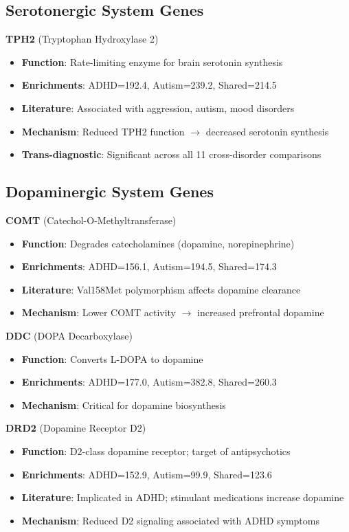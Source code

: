 \documentclass[12pt,letterpaper]{article}
\begin{document}
\subsection{Serotonergic System Genes}

\textbf{TPH2} (Tryptophan Hydroxylase 2)
\begin{itemize}
    \item \textbf{Function}: Rate-limiting enzyme for brain serotonin synthesis
    \item \textbf{Enrichments}: ADHD=192.4, Autism=239.2, Shared=214.5
    \item \textbf{Literature}: Associated with aggression, autism, mood disorders
    \item \textbf{Mechanism}: Reduced TPH2 function $\rightarrow$ decreased serotonin synthesis
    \item \textbf{Trans-diagnostic}: Significant across all 11 cross-disorder comparisons
\end{itemize}

\subsection{Dopaminergic System Genes}

\textbf{COMT} (Catechol-O-Methyltransferase)
\begin{itemize}
    \item \textbf{Function}: Degrades catecholamines (dopamine, norepinephrine)
    \item \textbf{Enrichments}: ADHD=156.1, Autism=194.5, Shared=174.3
    \item \textbf{Literature}: Val158Met polymorphism affects dopamine clearance
    \item \textbf{Mechanism}: Lower COMT activity $\rightarrow$ increased prefrontal dopamine
\end{itemize}

\textbf{DDC} (DOPA Decarboxylase)
\begin{itemize}
    \item \textbf{Function}: Converts L-DOPA to dopamine
    \item \textbf{Enrichments}: ADHD=177.0, Autism=382.8, Shared=260.3
    \item \textbf{Mechanism}: Critical for dopamine biosynthesis
\end{itemize}

\textbf{DRD2} (Dopamine Receptor D2)
\begin{itemize}
    \item \textbf{Function}: D2-class dopamine receptor; target of antipsychotics
    \item \textbf{Enrichments}: ADHD=152.9, Autism=99.9, Shared=123.6
    \item \textbf{Literature}: Implicated in ADHD; stimulant medications increase dopamine
    \item \textbf{Mechanism}: Reduced D2 signaling associated with ADHD symptoms
\end{itemize}
\end{document}
